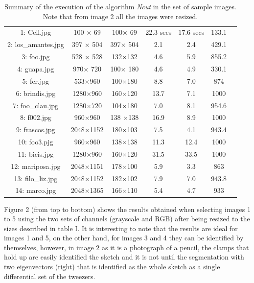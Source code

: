\documentclass[conference]{IEEEtran}
\begin{document}
\begin{table}[h]
\begin{center}
\begin{tabular}{c|cccccc}
1: Cell.jpg	     &100	$\times$ 69        & 100$\times$ 69 & 22.3 secs&	17.6 secs & 133.1\\
2: los\_amantes.jpg  &397 $\times$ 504     & 397$ \times$ 504   & 2.1 &2.4& 429.1\\
3: foo.jpg	&528 $\times$	528 &  132$\times$132	& 4.6&5.9 &855.2\\
4: guapa.jpg &970$\times$	720 & 100$\times$	180	&4.6& 4.9& 330.1\\
5: fer.jpg &533$\times$960 &100$\times$180 & 8.8 & 7.0 & 874\\
6: brindis.jpg	&1280$\times$960 & 160$\times$120 & 13.7 &7.1& 1000\\
7: foo\_clau.jpg &1280$\times$720&	104$\times$180 & 7.0& 8.1& 954.6\\
8: f002.jpg&960$\times$960&138 $\times$138& 16.9&8.9&1000\\
9: frascos.jpg&2048$\times$1152&180$\times$103&7.5&4.1&943.4\\
10: foo3.pjg&960$\times$960&138$\times$138&11.3&12.4&1000\\
11: bicis.jpg&1280$\times$960& 160$\times$120&31.5&33.5&1000\\
12: mariposa.jpg&2048$\times$1151&178$\times$100&5.9&3.3&863\\
13: filo\_liz.jpg&2048$\times$1152& 182$\times$102&7.9&7.0&943.8\\
14: marco.jpg&2048$\times$1365& 166$\times$110&5.4&4.7&933\\
\hline
\end{tabular}
\caption{Summary of the execution of the algorithm \textit {Ncut} in the set of sample images. Note that from image 2 all the images were resized.}
\label{tresultados}
\end{center}
\end{table}
\FloatBarrier
Figure 2 (from top to bottom) shows the results obtained when selecting images 1 to 5 using the two sets of channels (grayscale and RGB) after being resized to the sizes described in table I. It is interesting to note that the results are ideal for images 1 and 5, on the other hand, for images 3 and 4 they can be identified by themselves, however, in image 2 as it is a photograph of a pencil, the clamps that hold up are easily identified the sketch and it is not until the segmentation with two eigenvectors (right) that is identified as the whole sketch as a single differential set of the tweezers. \\
\end{document}
